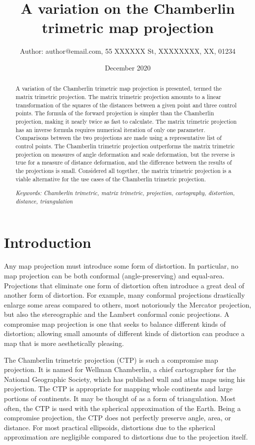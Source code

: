 \documentclass[]{interact}
\title{A variation on the Chamberlin trimetric map projection}
\author{Author: author@email.com, 55 XXXXXX St, XXXXXXXX, XX, 01234}
\date{December 2020}
\begin{document}
\maketitle
\begin{abstract}%
   A variation of the Chamberlin trimetric map projection is presented, termed
   the matrix trimetric projection. The matrix trimetric projection amounts to a
   linear transformation of the squares of the distances between a given point
   and three control points. The formula of the forward projection is simpler
   than the Chamberlin projection, making it nearly twice as fast to calculate.
   The matrix trimetric projection has an inverse formula requires numerical
   iteration of only one parameter. Comparisons between the two projections are
   made using a representative list of control points. The Chamberlin trimetric
   projection outperforms the matrix trimetric projection on measures of angle
   deformation and scale deformation, but the reverse is true for a measure of
   distance deformation, and the difference between the results of the
   projections is small. Considered all together, the matrix trimetric
   projection is a viable alternative for the use cases of the Chamberlin
   trimetric projection.

   \textit{Keywords: Chamberlin trimetric, matrix trimetric, projection,
   cartography, distortion, distance, triangulation}

\end{abstract}

\section{Introduction}
Any map projection must introduce some form of distortion. In particular, no
map projection can be both conformal (angle-preserving) and equal-area.
Projections that eliminate one form of distortion often introduce a great deal
of another form of distortion. For example, many conformal projections
drastically enlarge some areas compared to others, most notoriously the Mercator
projection, but also the stereographic and the Lambert conformal conic
projections. \citep{snyder87} A compromise map projection is one that seeks to
balance different kinds of distortion; allowing small amounts of different kinds
of distortion can produce a map that is more aesthetically pleasing.

The Chamberlin trimetric projection (CTP) is such a compromise map projection.
It is named for Wellman Chamberlin, a chief cartographer for the National
Geographic Society, which has published wall and atlas maps using his
projection. The CTP is appropriate for mapping whole continents and large
portions of continents. \citep{christensen} It may be thought of as a form of
triangulation. Most often, the CTP is used with the spherical approximation of
the Earth. Being a compromise projection, the CTP does
not perfectly preserve angle, area, or distance. For most practical ellipsoids,
distortions due to the spherical approximation are negligible compared to
distortions due to the projection itself.
\end{document}
